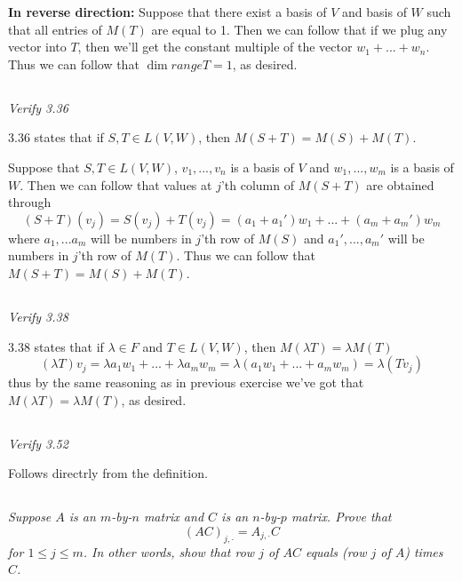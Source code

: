 \documentclass[11pt,oneside,titlepage]{book}
\begin{document}
\textbf{In reverse direction: }
Suppose that there exist a basis of $V$ and basis of $W$ such that all entries of $M(T)$  are
equal to 1. Then we can follow that if we plug any vector into $T$, then we'll get the
constant multiple of the vector $w_1 + ... + w_n$. Thus we can follow that
$\dim range T = 1$, as desired.

\subsection{}
\textit{Verify 3.36}

3.36 states that if $S, T \in L(V, W)$, then $M(S + T) = M(S) + M(T)$.

Suppose that $S, T \in L(V, W)$, $v_1, ..., v_n$ is a basis of $V$ and
$w_1, ..., w_m$ is a basis of $W$. Then we can follow that
values at $j$'th column of $M(S + T)$ are obtained through
$$(S + T)(v_j) =  S(v_j) + T(v_j) = (a_1 + a_1') w_1 + ... + (a_m + a_m')w_m$$
where $a_1, ... a_m$ will be numbers in $j$'th row of $M(S)$ and $a_1', ..., a_m'$ will
be numbers in $j$'th row of $M(T)$. Thus we can follow that $M(S + T) = M(S) + M(T)$.

\subsection{}

\textit{Verify 3.38}

3.38 states that if $\lambda \in F$ and $T \in L(V, W)$, then $M(\lambda T) = \lambda M(T)$
$$(\lambda T) v_j = \lambda a_1 w_1 + ... + \lambda a_m w_m =
\lambda (a_1 w_1 + ... + a_m w_m) = 
\lambda(T v_j)$$
thus by the same reasoning as in previous exercise we've got that $M(\lambda T) = \lambda M(T)$,
as desired.

\subsection{}

\textit{Verify 3.52}

Follows directrly from the definition.

\subsection{}

\textit{Suppose $A$ is an $m$-by-$n$ matrix and $C$ is an $n$-by-$p$ matrix. Prove that }
$$(AC)_{j, \cdot} = A_{j, \cdot}C$$
\textit{for $1 \leq j \leq m$. In other words, show that row $j$ of $AC$ equals (row $j$ of $A$)
  times $C$.}
\end{document}

